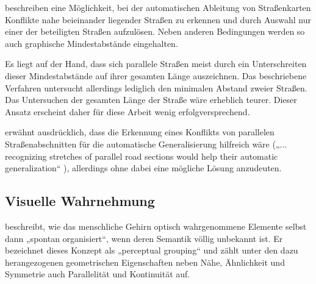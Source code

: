 \documentclass[../main/thesis.tex]{subfiles}
\begin{document}
 beschreiben eine Möglichkeit, bei der automatischen Ableitung von Straßenkarten Konflikte nahe beieinander liegender Straßen zu erkennen und durch Auswahl nur einer der beteiligten Straßen aufzulösen.
Neben anderen Bedingungen werden so auch graphische Mindestabstände eingehalten. 

Es liegt auf der Hand, dass sich parallele Straßen meist durch ein Unterschreiten dieser Mindestabstände auf ihrer gesamten Länge auszeichnen.
Das beschriebene Verfahren untersucht allerdings lediglich den minimalen Abstand zweier Straßen.
Das Untersuchen der gesamten Länge der Straße wäre erheblich teurer. 
Dieser Ansatz erscheint daher für diese Arbeit wenig erfolgversprechend.


 erwähnt ausdrücklich, dass die Erkennung eines Konflikts von parallelen Straßenabschnitten für die automatische Generalisierung hilfreich wäre („... recognizing stretches of parallel road sections would help their automatic generalization“ ), allerdings ohne dabei eine mögliche Lösung anzudeuten.


\subsection{Visuelle Wahrnehmung}


 beschreibt, wie das menschliche Gehirn optisch wahrgenommene Elemente selbst dann „spontan organisiert“, wenn deren Semantik völlig unbekannt ist.
Er bezeichnet dieses Konzept als „perceptual grouping“ und zählt unter den dazu herangezogenen geometrischen Eigenschaften neben Nähe, Ähnlichkeit und Symmetrie auch Parallelität und Kontinuität auf. 

\end{document}
